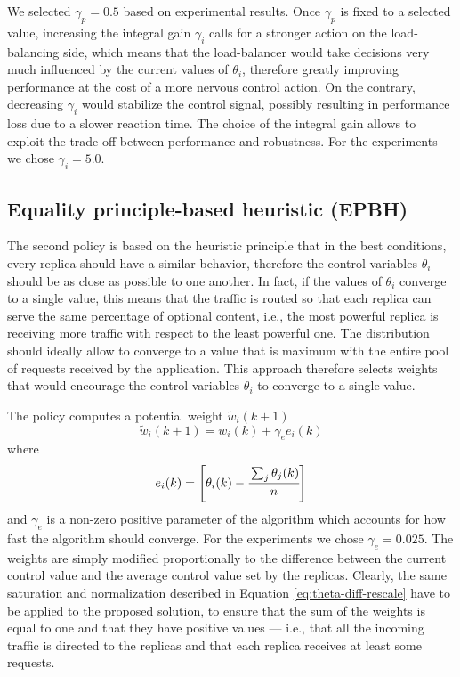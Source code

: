 We selected $\gamma_p = 0.5$ based on experimental results. Once
$\gamma_p$ is fixed to a selected value, increasing the integral gain
$\gamma_i$ calls for a stronger action on the load-balancing side,
which means that the load-balancer would take decisions very much
influenced by the current values of $\theta_i$, therefore greatly
improving performance at the cost of a more nervous control action. On
the contrary, decreasing $\gamma_i$ would stabilize the control
signal, possibly resulting in performance loss due to a slower
reaction time. The choice of the integral gain allows to exploit the
trade-off between performance and robustness. For the experiments we
chose $\gamma_i = 5.0$.

\subsection{Equality principle-based heuristic (EPBH)}

The second policy is based on the heuristic principle that in the best
conditions, every replica should have a similar behavior, therefore
the control variables $\theta_i$ should be as close as possible to one
another. In fact, if the values of $\theta_i$ converge to a single
value, this means that the traffic is routed so that each replica can
serve the same percentage of optional content, i.e., the most powerful
replica is receiving more traffic with respect to the least powerful one. The
distribution should ideally allow to converge to a value that is
maximum with the entire pool of requests received by the
application. This approach therefore selects weights that would
encourage the control variables $\theta_i$ to converge to a single
value.

The policy computes a potential weight $\tilde{w}_i(k+1)$
\begin{equation}
  \tilde{w}_i(k+1) = w_i(k) + \gamma_e e_i(k)
\label{eq:equal-thetas}
\end{equation}
where
$$e_i(k)=\left[ \theta_i (k) - \cfrac{\sum_j \theta_j (k) }{n} \right]$$
and $\gamma_e$ is a non-zero positive parameter of the algorithm which
accounts for how fast the algorithm should converge. For the
experiments we chose $\gamma_e = 0.025$. The weights are simply
modified proportionally to the difference between the current control
value and the average control value set by the replicas. Clearly, the
same saturation and normalization described in Equation
\eqref{eq:theta-diff-rescale} have to be applied to the proposed
solution, to ensure that the sum of the weights is equal to one and
that they have positive values --- i.e., that all the incoming traffic
is directed to the replicas and that each replica receives at least
some requests.

